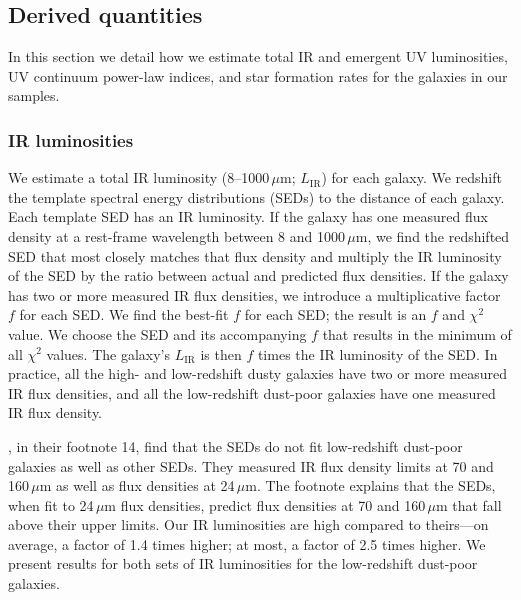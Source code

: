 \documentclass[referee]{aa}
\begin{document}
\subsection{Derived quantities}

In this section we detail how we estimate total IR and emergent UV
luminosities, UV continuum power-law indices, and star formation rates for the
galaxies in our samples.

\subsubsection{IR luminosities}

We estimate a total IR luminosity (8--1000$\,\mu$m; $L_{\mathrm{IR}}$) for
each galaxy.  We redshift the \citet{chary01} template spectral energy
distributions (SEDs) to the distance of each galaxy.  Each template SED has
an IR luminosity.  If the galaxy has one
measured flux density at a rest-frame wavelength between 8 and 1000$\,\mu$m,
we find the redshifted SED that most closely matches that flux
density and multiply the IR luminosity of the SED by the ratio between actual
and predicted flux densities.  If the galaxy has two or more measured IR flux
densities, we introduce a multiplicative factor $f$ for each SED.  We find the
best-fit $f$ for each SED; the result is an $f$ and $\chi^{2}$ value.  We
choose the SED and its accompanying $f$ that results in the
minimum of all $\chi^{2}$ values.  The galaxy's $L_{\mathrm{IR}}$ is then $f$
times the IR luminosity of the SED.  In practice, all the high- and
low-redshift dusty galaxies have two or more measured IR flux densities, and
all the low-redshift dust-poor galaxies have one measured IR flux density.

\citet{overzier11}, in their footnote 14, find that the \citet{chary01} SEDs do
not fit low-redshift dust-poor galaxies as well as other SEDs.  They measured
IR flux density limits at 70 and 160$\,\mu$m as well as flux densities at
24$\,\mu$m.  The footnote explains that the \citet{chary01} SEDs, when
fit to 24$\,\mu$m flux densities, predict flux densities at 70 and
160$\,\mu$m that fall above their upper limits.  Our IR luminosities are
high compared to theirs---on average, a factor of 1.4 times higher; at most, a
factor of 2.5 times higher.  We present results for both sets of IR
luminosities for the low-redshift dust-poor galaxies.
\end{document}
